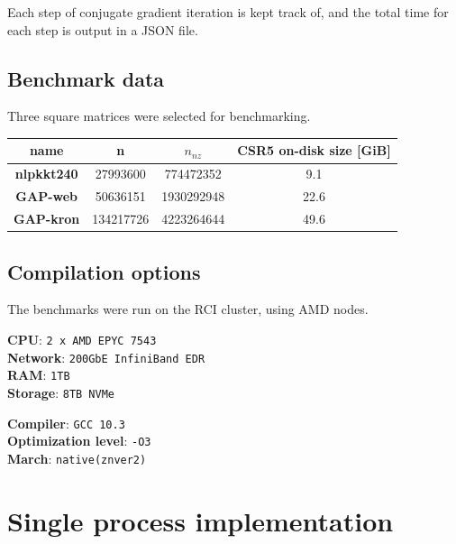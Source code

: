 \documentclass[thesis=M,english]{FITthesis}[2019/12/23]
\begin{document}
Each step of conjugate gradient iteration is kept track of, and the total time
for each step is output in a JSON file.

\subsection{Benchmark data}

Three square matrices were selected for benchmarking.

\begin{tabular}{|c|c|c|c|}
    \hline
    \textbf{name}      & \textbf{n} & $n_{nz}$   & \textbf{CSR5 on-disk size} [GiB] \\
    \hline
    \hline
    \textbf{nlpkkt240} & 27993600   & 774472352  & 9.1                              \\
    \hline
    \textbf{GAP-web}   & 50636151   & 1930292948 & 22.6                             \\
    \hline
    \textbf{GAP-kron}  & 134217726  & 4223264644 & 49.6                             \\
    \hline
\end{tabular}


\subsection{Compilation options}

The benchmarks were run on the RCI cluster, using AMD nodes.

\begin{minipage}{0.5\textwidth}
    \textbf{CPU}: \texttt{2 x AMD EPYC 7543} \\
    \textbf{Network}: \texttt{200GbE InfiniBand EDR}\\
    \textbf{RAM}: \texttt{1TB}\\
    \textbf{Storage}: \texttt{8TB NVMe} \\
\end{minipage}%
\begin{minipage}{0.5\textwidth}
    \textbf{Compiler}: \texttt{GCC 10.3} \\
    \textbf{Optimization level}: \texttt{-O3} \\
    \textbf{March}: \texttt{native(znver2)} \\
\end{minipage}



\section{Single process implementation}
\end{document}
